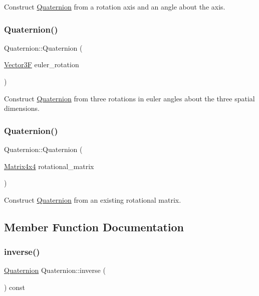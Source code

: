 Construct \mbox{\hyperlink{class_quaternion}{Quaternion}} from a rotation axis and an angle about the axis. \mbox{\label{class_quaternion_a51e4c3b86a987b3c4b3172dac812369f}} 
\subsubsection{\texorpdfstring{Quaternion()}{Quaternion()}\hspace{0.1cm}{\footnotesize\ttfamily [2/3]}}
{\footnotesize\ttfamily Quaternion\+::\+Quaternion (\begin{DoxyParamCaption}\item[{\mbox{\hyperlink{class_vector3}{Vector3F}}}]{euler\+\_\+rotation }\end{DoxyParamCaption})}

Construct \mbox{\hyperlink{class_quaternion}{Quaternion}} from three rotations in euler angles about the three spatial dimensions. \mbox{\label{class_quaternion_a2d6a1e75c5e91321c0afef7e3ed1b354}} 
\subsubsection{\texorpdfstring{Quaternion()}{Quaternion()}\hspace{0.1cm}{\footnotesize\ttfamily [3/3]}}
{\footnotesize\ttfamily Quaternion\+::\+Quaternion (\begin{DoxyParamCaption}\item[{\mbox{\hyperlink{class_matrix4x4}{Matrix4x4}}}]{rotational\+\_\+matrix }\end{DoxyParamCaption})}

Construct \mbox{\hyperlink{class_quaternion}{Quaternion}} from an existing rotational matrix. 

\subsection{Member Function Documentation}
\mbox{\label{class_quaternion_a38f69dc61e527847ab14b5b6aea5364a}} 
\subsubsection{\texorpdfstring{inverse()}{inverse()}}
{\footnotesize\ttfamily \mbox{\hyperlink{class_quaternion}{Quaternion}} Quaternion\+::inverse (\begin{DoxyParamCaption}{ }\end{DoxyParamCaption}) const}

